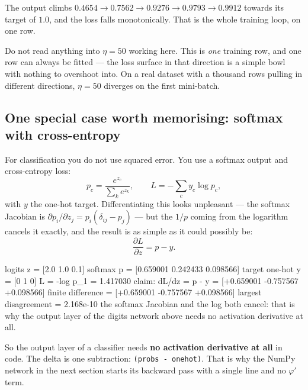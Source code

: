 \documentclass[11pt]{article}
\begin{document}
The output climbs $0.4654 \to 0.7562 \to 0.9276 \to 0.9793 \to 0.9912$ towards
its target of $1.0$, and the loss falls monotonically. That is the whole
training loop, on one row.

\begin{caution}
Do not read anything into $\eta = 50$ working here. This is \emph{one}
training row, and one row can always be fitted --- the loss surface in that
direction is a simple bowl with nothing to overshoot into. On a real dataset
with a thousand rows pulling in different directions, $\eta = 50$ diverges on
the first mini-batch.
\end{caution}

\subsection{One special case worth memorising: softmax with cross-entropy}
\label{sec:softmax}

For classification you do not use squared error. You use a softmax output and
cross-entropy loss:
\[
  p_c = \frac{e^{z_c}}{\sum_{k} e^{z_k}},
  \qquad
  L = -\sum_c y_c \log p_c,
\]
with $y$ the one-hot target. Differentiating this looks unpleasant --- the
softmax Jacobian is $\partial p_i/\partial z_j = p_i(\delta_{ij} - p_j)$ ---
but the $1/p$ coming from the logarithm cancels it exactly, and the result is
as simple as it could possibly be:
\begin{equation}
  \frac{\partial L}{\partial z} = p - y.
  \label{eq:softmaxgrad}
\end{equation}

\begin{codeout}
logits z          = [2.0 1.0 0.1]
softmax p         = [0.659001 0.242433 0.098566]
target one-hot y  = [0 1 0]
L = -log p_1      = 1.417030
claim: dL/dz = p - y = [+0.659001 -0.757567 +0.098566]
finite difference    = [+0.659001 -0.757567 +0.098566]
largest disagreement = 2.168e-10
the softmax Jacobian and the log both cancel: that is why the output
layer of the digits network above needs no activation derivative at all.
\end{codeout}

So the output layer of a classifier needs \textbf{no activation derivative at
all} in code. The delta is one subtraction: \texttt{(probs - onehot)}. That is
why the NumPy network in the next section starts its backward pass with a
single line and no $\varphi'$ term.

\end{document}
